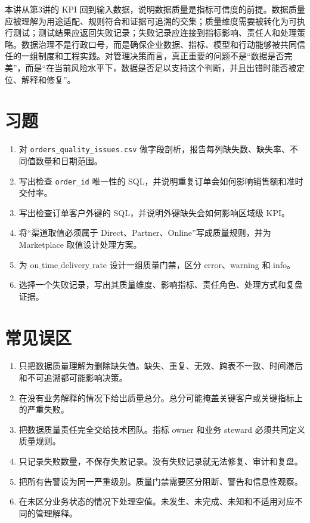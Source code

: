 \documentclass[UTF8,fontset=fandol,openany,zihao=-4]{ctexbook}
\begin{document}
本讲从第3讲的 KPI 回到输入数据，说明数据质量是指标可信度的前提。数据质量应被理解为用途适配、规则符合和证据可追溯的交集；质量维度需要被转化为可执行测试；测试结果应返回失败记录；失败记录应连接到指标影响、责任人和处理策略。数据治理不是行政口号，而是确保企业数据、指标、模型和行动能够被共同信任的一组制度和工程实践。对管理决策而言，真正重要的问题不是“数据是否完美”，而是“在当前风险水平下，数据是否足以支持这个判断，并且出错时能否被定位、解释和修复”。

\section*{习题}

\begin{exercise}
\begin{enumerate}
  \item 对 \texttt{orders\_quality\_issues.csv} 做字段剖析，报告每列缺失数、缺失率、不同值数量和日期范围。
  \item 写出检查 \texttt{order\_id} 唯一性的 SQL，并说明重复订单会如何影响销售额和准时交付率。
  \item 写出检查订单客户外键的 SQL，并说明外键缺失会如何影响区域级 KPI。
  \item 将“渠道取值必须属于 Direct、Partner、Online”写成质量规则，并为 Marketplace 取值设计处理方案。
  \item 为 \(\mathrm{on\_time\_delivery\_rate}\) 设计一组质量门禁，区分 error、warning 和 info。
  \item 选择一个失败记录，写出其质量维度、影响指标、责任角色、处理方式和复盘证据。
\end{enumerate}
\end{exercise}

\section*{常见误区}

\begin{enumerate}
  \item 只把数据质量理解为删除缺失值。缺失、重复、无效、跨表不一致、时间滞后和不可追溯都可能影响决策。
  \item 在没有业务解释的情况下给出质量总分。总分可能掩盖关键客户或关键指标上的严重失败。
  \item 把数据质量责任完全交给技术团队。指标 owner 和业务 steward 必须共同定义质量规则。
  \item 只记录失败数量，不保存失败记录。没有失败记录就无法修复、审计和复盘。
  \item 把所有告警设为同一严重级别。质量门禁需要区分阻断、警告和信息性观察。
  \item 在未区分业务状态的情况下处理空值。未发生、未完成、未知和不适用对应不同的管理解释。
\end{enumerate}
\end{document}
